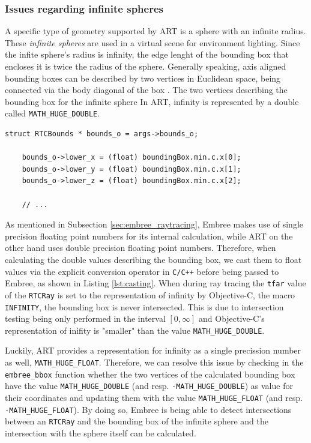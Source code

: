 \subsubsection{Issues regarding infinite spheres}

A specific type of geometry supported by ART is a sphere with an infinite radius. These \emph{infinite spheres} are used in a virtual scene for environment lighting.
Since the infite sphere's radius is infinity, the edge lenght of the bounding box that encloses it is twice the radius of the sphere. Generally speaking, axis aligned bounding boxes can be described by two vertices in Euclidean space, being connected via the body diagonal of the box . The two vertices describing the bounding box for the infinite sphere  In ART, infinity is represented by a double called \texttt{MATH\_HUGE\_DOUBLE}.

\begin{listing} 
	\begin{lstlisting}[caption={Casting of a double precision floating point number to a single precision floating point number by explicit conversion.}, label={lst:casting}]
	struct RTCBounds * bounds_o = args->bounds_o;
	
	bounds_o->lower_x = (float) boundingBox.min.c.x[0];
	bounds_o->lower_y = (float) boundingBox.min.c.x[1];
	bounds_o->lower_z = (float) boundingBox.min.c.x[2];
	
	// ...
	\end{lstlisting}
\end{listing}

As mentioned in Subsection \ref{sec:embree_raytracing}, Embree makes use of single precision floating point numbers for its internal calculation, while ART on the other hand uses double precision floating point numbers. Therefore, when calculating the double values describing the bounding box, we cast them to float values via the explicit conversion operator in \texttt{C/C++} before being passed to Embree, as shown in Listing \ref{lst:casting}.  
When during ray tracing the \texttt{tfar} value of the \texttt{RTCRay} is set to the representation of infinity by Objective-C, the macro \texttt{INFINITY}, the bounding box is never intersected. This is due to intersection testing being only performed in the interval $[0,\infty]$ and Objective-C's representation of inifity is "smaller" than the value \texttt{MATH\_HUGE\_DOUBLE}. 

Luckily, ART provides a representation for infinity as a single precission number as well, \texttt{MATH\_HUGE\_FLOAT}. Therefore, we can resolve this issue by checking in the \texttt{embree\_bbox} function whether the two vertices of the calculated bounding box have the value \texttt{MATH\_HUGE\_DOUBLE} (and resp. \texttt{-MATH\_HUGE\_DOUBLE}) as value for their coordinates and updating them with the value \texttt{MATH\_HUGE\_FLOAT} (and resp. \texttt{-MATH\_HUGE\_FLOAT}). By doing so, Embree is being able to detect intersections between an \texttt{RTCRay} and the bounding box of the infinite sphere and the intersection with the sphere itself can be calculated.

